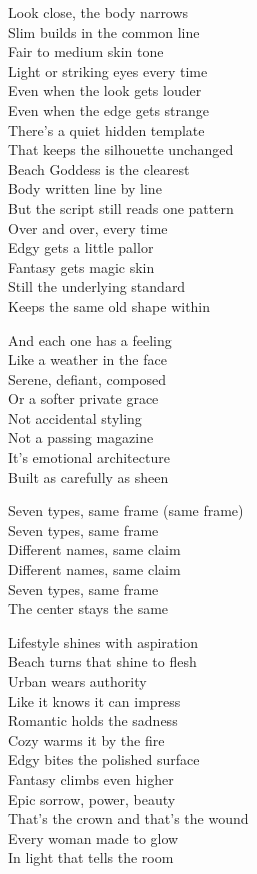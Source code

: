 \begin{lyrics}
Look close, the body narrows\\
Slim builds in the common line\\
Fair to medium skin tone\\
Light or striking eyes every time\\
Even when the look gets louder\\
Even when the edge gets strange\\
There’s a quiet hidden template\\
That keeps the silhouette unchanged\\
Beach Goddess is the clearest\\
Body written line by line\\
But the script still reads one pattern\\
Over and over, every time\\
Edgy gets a little pallor\\
Fantasy gets magic skin\\
Still the underlying standard\\
Keeps the same old shape within

And each one has a feeling\\
Like a weather in the face\\
Serene, defiant, composed\\
Or a softer private grace\\
Not accidental styling\\
Not a passing magazine\\
It’s emotional architecture\\
Built as carefully as sheen

Seven types, same frame (same frame)\\
Seven types, same frame\\
Different names, same claim\\
Different names, same claim\\
Seven types, same frame\\
The center stays the same

Lifestyle shines with aspiration\\
Beach turns that shine to flesh\\
Urban wears authority\\
Like it knows it can impress\\
Romantic holds the sadness\\
Cozy warms it by the fire\\
Edgy bites the polished surface\\
Fantasy climbs even higher\\
Epic sorrow, power, beauty\\
That’s the crown and that’s the wound\\
Every woman made to glow\\
In light that tells the room


\end{lyrics}
